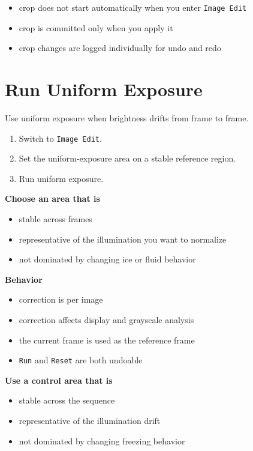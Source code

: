 \documentclass[
  9pt,
  letterpaper,
  oneside,
  open=any,
  DIV=15,
  parskip=half-,
  headings=big,
  numbers=noenddot
]{scrbook}
\newcommand{\manuallead}[1]{%
  \vspace{0.15em}%
  {\sffamily\bfseries\color{ManualBlue}#1}\par\nobreak\vspace{0.05em}%
}
\begin{document}
\begin{itemize}[leftmargin=*,itemsep=0.35em,topsep=0.4em]
\item crop does not start automatically when you enter \texttt{Image Edit}
\item crop is committed only when you apply it
\item crop changes are logged individually for undo and redo
\end{itemize}

\section{Run Uniform Exposure}

Use uniform exposure when brightness drifts from frame to frame.


\begin{enumerate}[leftmargin=*,itemsep=0.35em,topsep=0.4em]
\item Switch to \texttt{Image Edit}.
\item Set the uniform-exposure area on a stable reference region.
\item Run uniform exposure.
\end{enumerate}

\manuallead{Choose an area that is}

\begin{itemize}[leftmargin=*,itemsep=0.35em,topsep=0.4em]
\item stable across frames
\item representative of the illumination you want to normalize
\item not dominated by changing ice or fluid behavior
\end{itemize}

\manuallead{Behavior}

\begin{itemize}[leftmargin=*,itemsep=0.35em,topsep=0.4em]
\item correction is per image
\item correction affects display and grayscale analysis
\item the current frame is used as the reference frame
\item \texttt{Run} and \texttt{Reset} are both undoable
\end{itemize}

\manuallead{Use a control area that is}

\begin{itemize}[leftmargin=*,itemsep=0.35em,topsep=0.4em]
\item stable across the sequence
\item representative of the illumination drift
\item not dominated by changing freezing behavior
\end{itemize}
\end{document}
